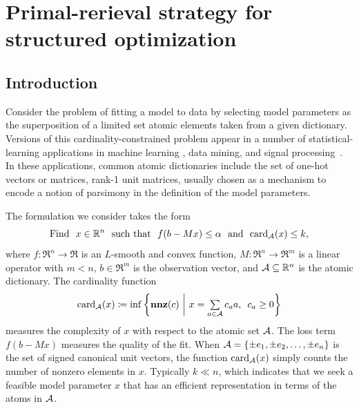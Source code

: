 \chapter{Primal-rerieval strategy for structured optimization}
\label{ch:App-Primal-Retrieval}

\section{Introduction} \label{sec:4-1}

Consider the problem of fitting a model to data by selecting model parameters as the superposition of a limited set atomic elements taken from a given dictionary. Versions of this cardinality-constrained problem appear in a number of statistical-learning applications in machine learning \cite{tibshirani1996regression,yul06,Meinshausen06,aep08}, data mining, and signal processing~\cite{candes:2013}. In these applications, common atomic dictionaries include the set of one-hot vectors or matrices, rank-1 unit matrices, usually chosen as a mechanism to encode a notion of parsimony in the definition of the model parameters.

The formulation we consider takes the form
\begin{equation} \label{eq:main_prob} 
    \mathop{\hbox{\rm Find}}\enspace x\in\mathbb{R}^n \enspace\mathop{\hbox{\rm such that}}\enspace f(b - Mx) \leq \alpha \enspace\mathop{\hbox{\rm and}}\enspace \operatorname{card}_{\mathcal{A}}(x) \leq k,
\end{equation}
where $f:\Re^n\to\Re$ is an $L$-smooth and convex function, $M: \Re^n \to \Re^m$ is a linear operator with $m < n$, $b \in \Re^m$ is the observation vector, and $\mathcal{A} \subseteq \mathbb{R}^n$ is the atomic dictionary. The cardinality function 
\begin{equation}\label{eq-card-fcn}
    \operatorname{card}_{\mathcal{A}}(x) \coloneqq \inf\left\{ \mathbf{nnz}(c) ~\bigg\vert~ x = \textstyle\sum\limits_{a \in \mathcal{A}} c_a a, \enspace c_a \geq 0\right\}
\end{equation}
measures the complexity of $x$ with respect to the atomic set $\mathcal{A}$.  The loss term $f(b - Mx)$ measures the quality of the fit. When $\mathcal{A} = \{ \pm e_1,\pm e_2, \ldots,\pm e_n \}$ is the set of signed canonical unit vectors, the function $\operatorname{card}_{\mathcal{A}}(x)$ simply counts the number of nonzero elements in $x$. Typically $k\ll n$, which indicates that we seek a feasible model parameter $x$ that has an efficient representation in terms of the atoms in $\mathcal{A}$.

